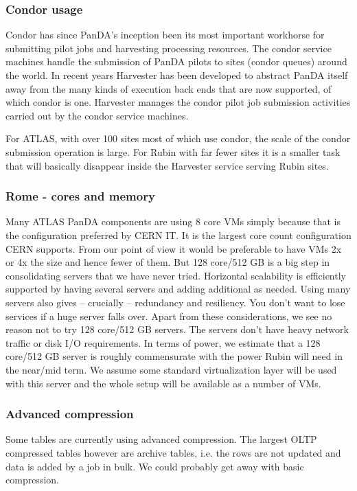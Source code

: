 \subsubsection {Condor usage }
Condor has since PanDA’s inception been its most important workhorse for submitting pilot jobs and harvesting processing resources. The condor service machines handle the submission of PanDA pilots to sites (condor queues) around the world. In recent years Harvester has been developed to abstract PanDA itself away from the many kinds of execution back ends that are now supported, of which condor is one. Harvester manages the condor pilot job submission activities carried out by the condor service machines.

For ATLAS, with over 100 sites most of which use condor, the scale of the condor submission operation is large. For Rubin with far fewer sites it is a smaller task that will basically disappear inside the Harvester service serving Rubin sites.

\subsubsection{Rome  - cores and memory }
Many ATLAS PanDA components are using 8 core VMs simply because that is the configuration preferred by CERN IT. It is the largest core count configuration CERN supports. From our point of view it would be preferable to have VMs 2x or 4x the size and hence fewer of them. But 128 core/512 GB is a big step in consolidating servers that we have never tried. Horizontal scalability is efficiently supported by having several servers and adding additional as needed. Using many servers also gives -- crucially -- redundancy and resiliency. You don’t want to lose services if a huge server falls over.  Apart from these considerations, we see no reason not to try 128 core/512 GB servers. The servers don't have heavy network traffic or disk I/O requirements. In terms of power, we estimate that a 128 core/512 GB server is roughly commensurate with the power Rubin will need in the near/mid term. We assume some standard virtualization layer will be used with this server and the whole setup will be available as a number of VMs.

\subsubsection{Advanced compression}
Some tables are currently using advanced compression. The largest OLTP compressed tables however are archive tables, i.e. the rows are not updated and data is added by a job in bulk. We could probably get away with basic compression.

